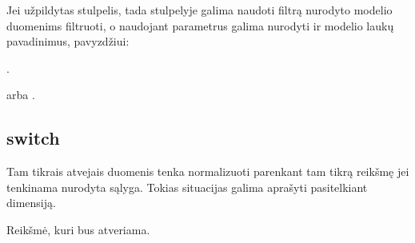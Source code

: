\documentclass[letterpaper,10pt,lithuanian]{sphinxmanual}
\begin{document}
\sphinxAtStartPar
Jei užpildytas {\hyperref[\detokenize{dimensijos:param.source}]{}} stulpelis, tada {\hyperref[\detokenize{dimensijos:module-param.prepare}]{}}
stulpelyje galima naudoti filtrą nurodyto {\hyperref[\detokenize{dimensijos:param.source}]{}} modelio duomenims
filtruoti, o naudojant parametrus galima nurodyti ir modelio laukų pavadinimus,
pavyzdžiui:
\begin{description}
\sphinxAtStartPar
{}.

\sphinxAtStartPar
{} arba .

\end{description}


\subsection{switch}
\label{\detokenize{dimensijos:switch}}\label{\detokenize{dimensijos:id13}}\label{\detokenize{dimensijos:module-switch}}
\sphinxAtStartPar
Tam tikrais atvejais duomenis tenka normalizuoti parenkant tam tikrą reikšmę jei
tenkinama nurodyta sąlyga. Tokias situacijas galima aprašyti pasitelkiant
{\hyperref[\detokenize{dimensijos:module-switch}]{}} dimensiją.

\begin{fulllineitems}
\label{\detokenize{dimensijos:switch.switch.source}}
\pysigstartsignatures
{}
\pysigstopsignatures
\sphinxAtStartPar
Reikšmė, kuri bus atveriama.

\end{fulllineitems}

\end{document}
